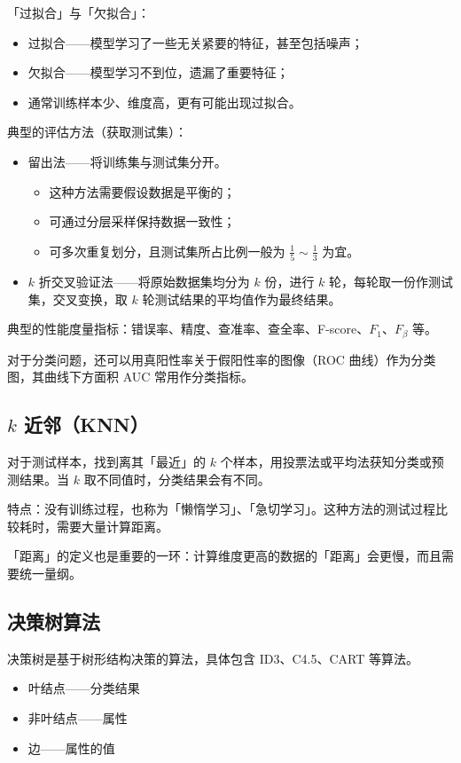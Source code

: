\documentclass[UTF8]{ctexart}
\newcommand\Emph[1]{\colorbox{green!10}{\textcolor{green!30!black}{#1}}}
\begin{document}
\noindent\Emph{「过拟合」}与「欠拟合」：
\begin{itemize}[itemsep=0pt,parsep=0pt]
  \item 过拟合——模型学习了一些无关紧要的特征，甚至包括噪声；
  \item 欠拟合——模型学习不到位，遗漏了重要特征；
  \item 通常训练样本少、维度高，更有可能出现过拟合。
\end{itemize}

\noindent 典型的评估方法（获取测试集）：
\begin{itemize}[itemsep=0pt,parsep=0pt]
    \item 留出法——将训练集与测试集分开。
    \begin{itemize}[itemsep=0pt,parsep=0pt]
      \item 这种方法需要假设数据是平衡的；
      \item 可通过分层采样保持数据一致性；
      \item 可多次重复划分，且测试集所占比例一般为 $\frac15\sim\frac13$ 为宜。
    \end{itemize}
    \item $k$ 折交叉验证法——将原始数据集均分为 $k$ 份，进行 $k$ 轮，每轮取一份作测试集，交叉变换，取 $k$ 轮测试结果的平均值作为最终结果。
\end{itemize}

\noindent 典型的性能度量指标：错误率、精度、查准率、查全率、F-score、$F_1$、$F_\beta$ 等。

\noindent 对于分类问题，还可以用真阳性率关于假阳性率的图像（ROC 曲线）作为分类图，其曲线下方面积 AUC 常用作分类指标。

\subsection{$k$ 近邻（KNN）}
对于测试样本，找到离其「最近」的 $k$ 个样本，用投票法或平均法获知分类或预测结果。当 $k$ 取不同值时，分类结果会有不同。

特点：\Emph{没有训练过程}，也称为「懒惰学习」、「急切学习」。这种方法的测试过程比较耗时，需要大量计算距离。

「距离」的定义也是重要的一环：计算维度更高的数据的「距离」会更慢，而且需要统一量纲。

\subsection{决策树算法}
决策树是基于树形结构决策的算法，具体包含 ID3、C4.5、CART 等算法。
\begin{itemize}[itemsep=0pt,parsep=0pt]
  \item 叶结点——分类结果
  \item 非叶结点——属性
  \item 边——属性的值
\end{itemize}
\end{document}

